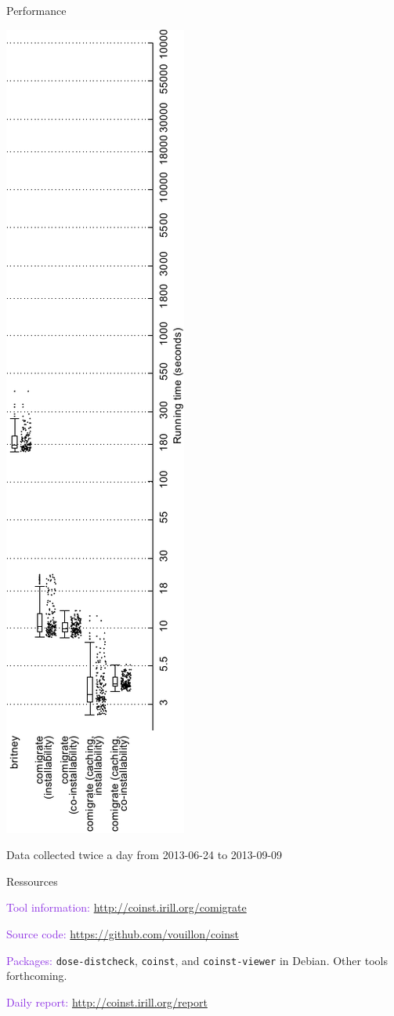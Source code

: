 \documentclass[xcolor={dvipsnames}]{beamer}
\newcommand{\EEE}[1]{\textcolor{BlueViolet}{#1}}
\begin{document}
\begin{frame}{Performance}

\includegraphics[height=\linewidth,angle=-90]{figures/performance.pdf}

\vspace{2em}

\scriptsize
Data collected twice a day from 2013-06-24 to 2013-09-09
\end{frame}


\begin{frame}{Ressources}

\EEE{Tool information:} \url{http://coinst.irill.org/comigrate}

\vspace{1em}

\EEE{Source code:} \url{https://github.com/vouillon/coinst}

\vspace{1em}

\EEE{Packages:} \texttt{dose-distcheck}, \texttt{coinst}, and
\texttt{coinst-viewer} in Debian. Other tools forthcoming.

\vspace{1em}

\EEE{Daily report:}
\url{http://coinst.irill.org/report}
\end{frame}
\end{document}
